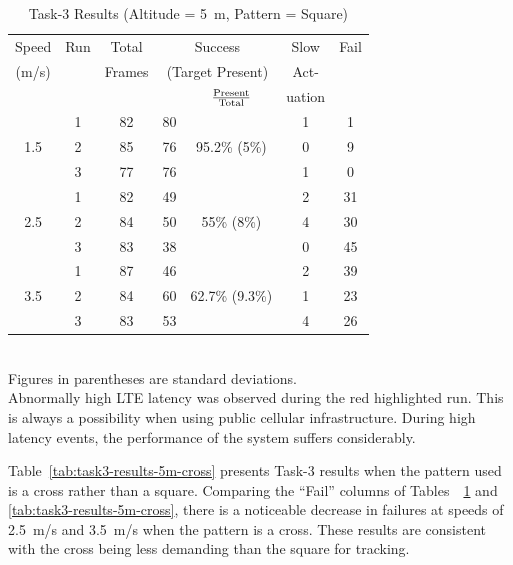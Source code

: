 \begin{table}
	\centering\small
	\begin{tabular}{|c|c|c|c|c|c|c|}
		\hline
		Speed & Run & Total & \multicolumn{2}{c|}{Success} & Slow & Fail\\
		(m/s) &  & Frames  & \multicolumn{2}{c|}{\footnotesize (Target Present)} & Act- &  \\
		\cline{5-5} 
		&  &         &         & $\rm \frac{Present}{Total}$ & uation  & \\ 
		\hline
		& 1 & 82 & 80 & & 1 & 1 \\
		1.5 & 2 & 85 & 76 & 95.2\% \scriptsize{(5\%)}  & 0 & 9 \\
		& 3 & 77 & 76 & & 1 & 0\\
		\hline
		& 1 & 82 & 49 & & 2 & 31 \\
		2.5 & 2 & 84 & 50 & 55\% \scriptsize{(8\%)} & 4 & 30 \\
		& \cellcolor{red!30}3 & \cellcolor{red!30}83 & \cellcolor{red!30}38 & & \cellcolor{red!30}0 & \cellcolor{red!30}45 \\
		\hline
		& 1 & 87 & 46 & & 2 & 39 \\
		3.5 & 2 & 84 & 60 & 62.7\% \scriptsize{(9.3\%)} & 1 & 23  \\
		& 3 & 83 & 53 & & 4 & 26 \\
		\hline
	\end{tabular}
	\begin{captext}
		\centering \\[0.1cm] Figures in parentheses are standard deviations.\\
		Abnormally high LTE latency was observed during the red highlighted run. This is always a possibility when using public cellular infrastructure. During high latency events, the performance of the system suffers considerably.
	\end{captext}
	\caption{Task-3 Results {\small (Altitude = 5~m, Pattern = Square)}}
	\label{tab:task3-results-5m-square}
\end{table}


Table~\ref{tab:task3-results-5m-cross} presents Task-3 results when
the pattern used is a cross rather than a square.  Comparing the
``Fail'' columns of Tables~~\ref{tab:task3-results-5m-square} and
\ref{tab:task3-results-5m-cross}, there is a noticeable decrease in
failures at speeds of 2.5~m/s and 3.5~m/s when the pattern is a cross.
These results are consistent with the cross being less demanding than
the square for tracking.

